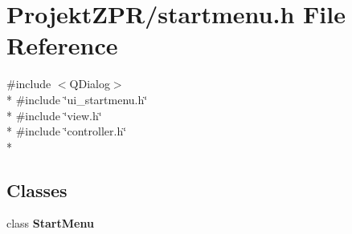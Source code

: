 \section{Projekt\-Z\-P\-R/startmenu.h File Reference}
\label{startmenu_8h}
{\ttfamily \#include $<$Q\-Dialog$>$}\\*
{\ttfamily \#include \char`\"{}ui\-\_\-startmenu.\-h\char`\"{}}\\*
{\ttfamily \#include \char`\"{}view.\-h\char`\"{}}\\*
{\ttfamily \#include \char`\"{}controller.\-h\char`\"{}}\\*
\subsection*{Classes}
\begin{DoxyCompactItemize}
\item 
class {\bf Start\-Menu}
\end{DoxyCompactItemize}
